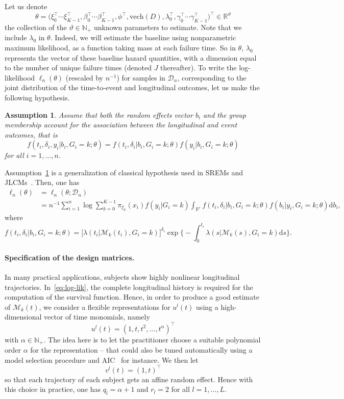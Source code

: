\documentclass[11pt]{article}
\newtheorem{assumption}{Assumption}{\bf}{\rm}
\newcommand{\dd}{\mathrm{d}}
\newcommand{\cM}{\mathcal M}
\newcommand{\cD}{\mathcal D}
\newcommand{\R}{\mathds R}
\newcommand{\N}{\mathds N}
\begin{document}
Let us denote 
\[ \theta = \big(\xi_0^\top \cdots \xi_{K-1}^\top, \beta_0^\top \cdots \beta_{K-1}^\top, \phi^\top, \text{vech}(D), \lambda_0^\top, \gamma_0^\top \cdots \gamma_{K-1}^\top\big)^\top \in \R^\vartheta \]
the collection of the $\vartheta \in \N_+$ unknown parameters to estimate. Note that we include $\lambda_0$ in $\theta$. Indeed, we will estimate the baseline using nonparametric maximum likelihood, as a function taking mass at each failure time. So in $\theta$, $\lambda_0$ represents the vector of these baseline hazard quantities, with a dimension equal to the number of unique failure times (denoted $J$ thereafter).
To write the log-likelihood $\ell_n(\theta)$ (rescaled by $n^{-1}$)  for samples in $\cD_n$, corresponding to the joint distribution of the time-to-event and longitudinal outcomes, let us make the following hypothesis.
\begin{assumption}
\label{indep-hyp-3}
Assume that both the random effects vector $b_i$ and the group membership account for the association between the longitudinal and event outcomes, that is
\begin{equation}
  \label{eq:ind-hyp}
  f(t_i, \delta_i, y_i | b_i, G_i = k ; \theta) = f(t_i, \delta_i| b_i, G_i = k ; \theta) f(y_i | b_i, G_i = k ; \theta)
\end{equation}
for all $i=1, \ldots, n$.
\end{assumption}
Assumption~\ref{indep-hyp-3} is a generalization of classical hypothesis used in SREMs and JLCMs~\citep{hickey2016joint}.
Then, one has
\begin{align}
	\label{eq:log-lik}
	\ell_n(\theta) &= \ell_n(\theta ; \cD_n) \nonumber \\
	&= n^{-1} \sum_{i=1}^n \log \sum_{k=0}^{K-1} \pi_{\xi_k}(x_i) f(y_i | G_i = k)\int_{\R^r} f(t_i, \delta_i| b_i, G_i = k ; \theta) f(b_i | y_i, G_i = k; \theta) \dd b_i,
\end{align}
where 
\[f(t_i, \delta_i| b_i, G_i = k ; \theta) = \big[\lambda(t_i|\cM_k(t_i), G_i = k)\big]^{\delta_i} \exp \Big\{-\int_0^{t_i} \lambda(s|\cM_k(s), G_i = k) \dd s \Big\}. \]

\paragraph{Specification of the design matrices.}
 
In many practical applications, subjects show highly nonlinear longitudinal trajectories. In~\eqref{eq:log-lik}, the complete longitudinal history is required for the computation of the survival function. Hence, in order to produce a good estimate of $\cM_k(t)$, we consider a flexible representations for $u^l(t)$ using a high-dimensional vector of time monomials, namely 
\[u^l(t) = (1, t, t^2, \ldots, t^\alpha)^\top\]
with $\alpha \in \N_+$.
The idea here is to let the practitioner choose a suitable polynomial order $\alpha$ for the representation -- that could also be tuned automatically using a model selection procedure and AIC~\citep{akaike1974new} for instance.
We then let \[v^l(t) = (1, t)^\top\] so that each trajectory of each subject gets an affine random effect. Hence with this choice in practice, one has $q_l=\alpha + 1$ and $r_l=2$ for all $l=1, \ldots, L$.
\end{document}
